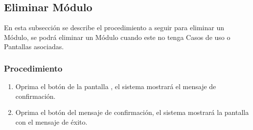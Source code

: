 \subsection{Eliminar Módulo}

En esta subsección se describe el procedimiento a seguir para eliminar un Módulo, se podrá eliminar un Módulo cuando este no tenga Casos de uso o Pantallas asociadas.

\subsubsection{Procedimiento}
\begin{enumerate}
	\item Oprima el botón \btnEliminar de la pantalla , el sistema mostrará el mensaje de confirmación.
	
	\item Oprima el botón  del mensaje de confirmación, el sistema mostrará la pantalla  con el mensaje de éxito.
\end{enumerate}

